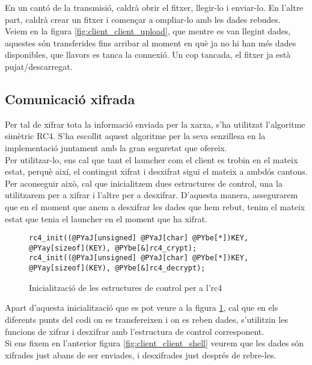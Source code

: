 En un cantó de la transmisió, caldrà obrir el fitxer, llegir-lo i enviar-lo. En l'altre part,
caldrà crear un fitxer i començar a ompliar-lo amb les dades rebudes. \\

Veiem en la figura \ref{fig:client_client_upload}, que mentre es van llegint dades, aquestes són transferides fins arribar
al moment en què ja no hi han més dades disponibles, que llavors es tanca la connexió. Un cop tancada, el fitxer ja està pujat/descarregat.

\subsection{Comunicació xifrada}

Per tal de xifrar tota la informació enviada per la xarxa, s'ha utilitzat l'algoritme simètric RC4.
S'ha escollit aquest algoritme per la seva senzillesa en la implementació juntament amb la gran seguretat
que ofereix. \\

Per utilitzar-lo, ens cal que tant el launcher com el client es trobin en el mateix estat, perquè així,
el contingut xifrat i desxifrat sigui el mateix a ambdós cantons. Per aconseguir això, cal que inicialitzem
dues estructures de control, una la utilitzarem per a xifrar i l'altre per a desxifrar. D'aquesta manera, 
assegurarem que en el moment que anem a desxifrar les dades que hem rebut, tenim el mateix estat que tenia el 
launcher en el moment que ha xifrat. \\

\begin{figure}[h!]
\begin{Verbatim}[commandchars=@\[\]]
rc4_init((@PYaJ[unsigned] @PYaJ[char] @PYbe[*])KEY, @PYay[sizeof](KEY), @PYbe[&]rc4_crypt);
rc4_init((@PYaJ[unsigned] @PYaJ[char] @PYbe[*])KEY, @PYay[sizeof](KEY), @PYbe[&]rc4_decrypt);
\end{Verbatim}
    \caption{Inicialització de les estructures de control per a l'rc4}
    \label{fig:rc4_inits}
\end{figure}

Apart d'aquesta inicialització que es pot veure a la figura \ref{fig:rc4_inits}, cal que en els diferents punts del codi on es transfereixen i on es reben 
dades, s'utilitzin les funcions de xifrar i desxifrar amb l'estructura de control corresponent. \\

Si ens fixem en l'anterior figura \ref{fig:client_client_shell} veurem que les dades són xifrades just abans
de ser enviades, i desxifrades just després de rebre-les.


